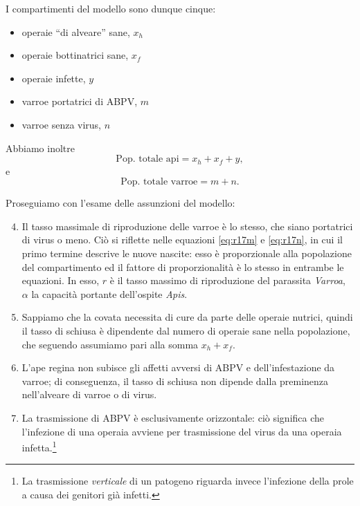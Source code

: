 I compartimenti del modello sono dunque cinque:
\begin{itemize}
    \item operaie ``di alveare'' sane, $x_h$
    \item operaie bottinatrici sane, $x_f$
    \item operaie infette, $y$
    \item varroe portatrici di ABPV, $m$
    \item varroe senza virus, $n$
\end{itemize}

Abbiamo inoltre
$$\text{Pop. totale api} = x_h + x_f + y,$$
e
$$\text{Pop. totale varroe} = m + n.$$

Proseguiamo con l'esame delle assunzioni del modello:
\begin{enumerate}
    \setcounter{enumi}{3}
    \item Il tasso massimale di riproduzione delle varroe è lo stesso, che siano portatrici di virus o meno.
    Ciò si riflette nelle equazioni \eqref{eq:r17m} e \eqref{eq:r17n}, in cui il primo termine descrive le nuove nascite: esso è proporzionale alla popolazione del compartimento ed il fattore di proporzionalità è lo stesso in entrambe le equazioni. In esso, $r$ è il tasso massimo di riproduzione del parassita \emph{Varroa}, $\alpha$ la capacità portante dell'ospite \emph{Apis}.
    \item Sappiamo che la covata necessita di cure da parte delle operaie nutrici, quindi il tasso di schiusa è dipendente dal numero di operaie sane nella popolazione, che seguendo \cite{khoury2011} assumiamo pari alla somma $x_h + x_f$.
    \item L'ape regina non subisce gli affetti avversi di ABPV e dell'infestazione da varroe; di conseguenza, il tasso di schiusa non dipende dalla preminenza nell'alveare di varroe o di virus.
    \item La trasmissione di ABPV è esclusivamente orizzontale: ciò significa che l'infezione di una operaia avviene per trasmissione del virus da una operaia infetta.\footnote{La trasmissione \emph{verticale} di un patogeno riguarda invece l'infezione della prole a causa dei genitori già infetti.}


\end{enumerate}
